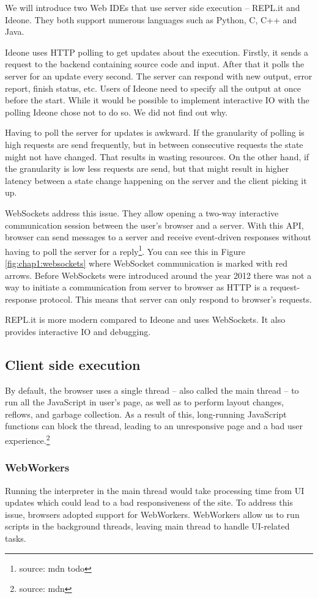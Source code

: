 We will introduce two Web IDEs that use server side execution -- REPL.it and Ideone. They both support numerous languages such
as Python, C, C++ and Java.

Ideone uses HTTP polling to get updates about the execution. Firstly, it sends a request to the backend containing source code and input.
After that it polls the server for an update every second. The server can respond with new output, error report, finish status, etc. Users of Ideone need to
specify all the output at once before the start. While it would be possible to implement interactive IO with the polling Ideone chose not to do so.
We did not find out why.

Having to poll the server for updates is awkward. If the granularity of polling is high requests are send frequently, but
in between consecutive requests the state might not have changed. That results in wasting resources. On the other hand, if the granularity is low less
requests are send, but that might result in higher latency between a state change happening on the server and the client picking it up.

WebSockets address this issue. They allow opening a two-way interactive communication session between the user's browser and a server.
With this API, browser can send messages to a server and receive event-driven responses without having to poll the server for a reply\footnote{source: mdn todo}.
You can see this in Figure \ref{fig:chap1:websockets} where WebSocket communication is marked with red arrows.
Before WebSockets were introduced around the year 2012 there was not a way to initiate a communication from server to browser as HTTP is a request-response
protocol. This means that server can only respond to browser's requests.

REPL.it is more modern compared to Ideone and uses WebSockets. It also provides interactive IO and debugging.

\subsection{Client side execution}
By default, the browser uses a single thread -- also called the main thread -- to run all the JavaScript in user's page, as well as to perform layout
changes, reflows, and garbage collection. As a result of this, long-running JavaScript functions can block the thread, leading to an unresponsive page and
a bad user experience.\footnote{source: mdn}

\subsubsection{WebWorkers}
Running the interpreter in the main thread would take processing time from UI updates which could lead to a bad responsiveness of the site. To
address this issue, browsers adopted support for WebWorkers. WebWorkers allow us to run scripts in the background threads, leaving main thread
to handle UI-related tasks.

